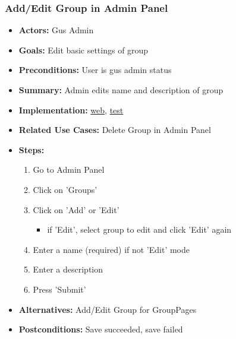 		\subsubsection{Add/Edit Group in Admin Panel}
			\begin{itemize}
				\item{\textbf{Actors:} Gus Admin}
				\item{\textbf{Goals:} Edit basic settings of group}
				\item{\textbf{Preconditions:} User is gus admin status}
				\item{\textbf{Summary:} Admin edits name and description of group}
				\item{\textbf{Implementation:} 	\href{http://nwerp.org/gus/index.php/groups/add}{web},
								\href{http://nwerp.org/gus/index.php/groups/test}{test}
				}
				\item{\textbf{Related Use Cases:} Delete Group in Admin Panel}
				\item{\textbf{Steps:}}
				\begin{enumerate}
					\item Go to Admin Panel
					\item Click on 'Groups'
					\item Click on 'Add' or 'Edit'
					\begin{itemize}
						\item if 'Edit', select group to edit and click 'Edit' again
					\end{itemize}
					\item Enter a name (required) if not 'Edit' mode
					\item Enter a description
					\item Press 'Submit'
				\end{enumerate}
				\item{\textbf{Alternatives:} Add/Edit Group for GroupPages}
				\item{\textbf{Postconditions:} Save succeeded, save failed}
			\end{itemize}

